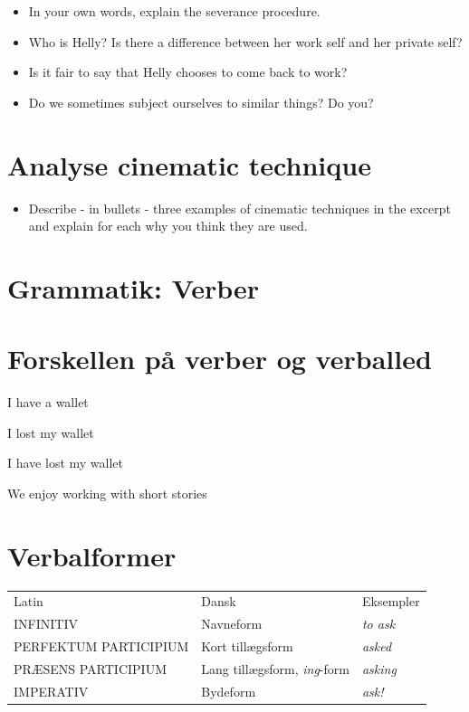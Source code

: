 \documentclass[11pt,a4paper,oneside]{book}
\begin{document}
\begin{itemize}
\item In your own words, explain the severance procedure.
\item Who is Helly? Is there a difference between her work self and her private self?
\item Is it fair to say that Helly chooses to come back to work?
\item Do we sometimes subject ourselves to similar things? Do you?
\end{itemize}

\section*{Analyse cinematic technique}

\begin{itemize}
\item Describe - in bullets - three examples of cinematic techniques in the excerpt and explain for each why you think they are used.
\end{itemize}

\section*{Grammatik: Verber}

\section*{Forskellen på verber og verballed}
\begin{taskbox}
I have a wallet

I lost my wallet

I have lost my wallet

We enjoy working with short stories

\end{taskbox}

\section*{Verbalformer}

{\small\setlength{\tabcolsep}{4pt}\renewcommand{\arraystretch}{1.3}\begin{tabularx}{\linewidth}{@{}>{\raggedright\arraybackslash}X>{\raggedright\arraybackslash}X>{\raggedright\arraybackslash}X@{}}\toprule
Latin & Dansk & Eksempler\\
INFINITIV & Navneform & \emph{to ask}\\
PERFEKTUM PARTICIPIUM & Kort tillægsform & \emph{asked}\\
PRÆSENS PARTICIPIUM & Lang tillægsform, \emph{ing}-form & \emph{asking}\\
IMPERATIV & Bydeform & \emph{ask!}\\
\bottomrule\end{tabularx}}\par\medskip
\end{document}
